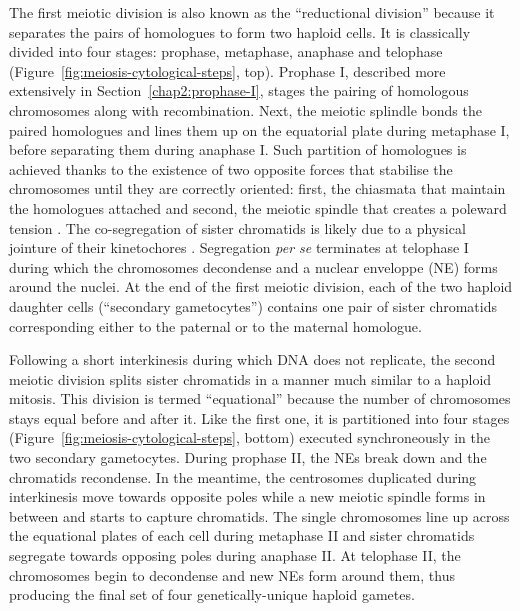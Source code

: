 The first meiotic division is also known as the “reductional division” because it separates the pairs of homologues to form two haploid cells. 
It is classically divided into four stages: prophase, metaphase, anaphase and telophase (Figure~\ref{fig:meiosis-cytological-steps}, top).
Prophase I, described more extensively in Section~\ref{chap2:prophase-I}, stages the pairing of homologous chromosomes along with recombination.
Next, the meiotic splindle bonds the paired homologues and lines them up on the equatorial plate during metaphase I, before separating them during anaphase I. 
Such partition of homologues is achieved thanks to the existence of two opposite forces that stabilise the chromosomes until they are correctly oriented: first, the chiasmata that maintain the homologues attached and second, the meiotic spindle that creates a poleward tension \citep{petronczki2003menage}.
The co-segregation of sister chromatids is likely due to a physical jointure of their kinetochores \citep{nasmyth2015meiotic}.
Segregation \textit{per se} terminates at telophase I during which the chromosomes decondense and a nuclear enveloppe (NE) forms around the nuclei.
At the end of the first meiotic division, each of the two haploid daughter cells (“secondary gametocytes”) contains one pair of sister chromatids corresponding either to the paternal or to the maternal homologue.

Following a short interkinesis during which DNA does not replicate, the second meiotic division splits sister chromatids in a manner much similar to a haploid mitosis. 
This division is termed “equational” because the number of chromosomes stays equal before and after it.
Like the first one, it is partitioned into four stages (Figure~\ref{fig:meiosis-cytological-steps}, bottom) executed synchroneously in the two secondary gametocytes.
During prophase II, the NEs break down and the chromatids recondense. 
In the meantime, the centrosomes duplicated during interkinesis move towards opposite poles while a new meiotic spindle forms in between and starts to capture chromatids.
The single chromosomes line up across the equational plates of each cell during metaphase II and sister chromatids segregate towards opposing poles during anaphase II\@.
At telophase II, the chromosomes begin to decondense and new NEs form around them, thus producing the final set of four genetically-unique haploid gametes.\\



